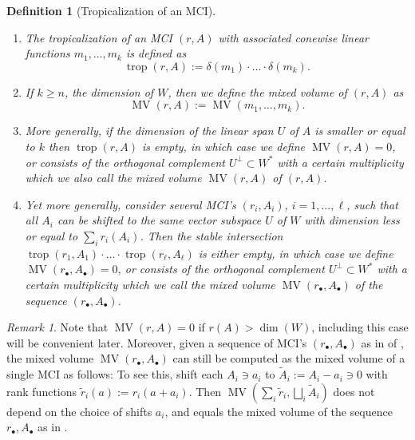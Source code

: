 \documentclass[a4paper]{article}
\newtheorem{definition}{Definition}
\theoremstyle{remark}
\newtheorem{remark}{Remark}
\def\corn{\delta}
\DeclareMathOperator{\trop}{trop}
\DeclareMathOperator{\mv}{MV}
\begin{document}
\begin{definition}[Tropicalization of an MCI]
  \label{def:tropmci}
  \begin{enumerate}
  \item The {\em tropicalization of an MCI} $(r,A)$ with associated conewise
  linear functions $m_1,\dots,m_k$ is defined as
  \[\trop(r,A) := \corn(m_1)\cdot \hdots \cdot \corn(m_k).\]
  \item \label{defitem:mv1} If $k \geq n$, the dimension of $W$, then we
  define the {\em mixed volume} of $(r,A)$ as
  \[\mv(r,A):= \mv(m_1,\dots,m_k).\]
\item \label{defitem:mv2} More generally, if the dimension of the linear span $U$ of $A$
  is smaller or equal to $k$ then $\trop(r,A)$ is empty, in which
  case we define $\mv(r,A) = 0$, or consists of the orthogonal
  complement $U^{\bot}\subset W^{*}$ with a certain multiplicity which we also call
  the mixed volume $\mv(r,A)$ of $(r,A)$.
\item \label{defitem:tropmciseq} Yet more generally, consider several MCI's $(r_i,A_i)$,
  $i=1,\dots,\ell$, such that all $A_i$ can be shifted to the same vector
  subspace $U$ of $W$ with dimension less or equal to
  $\sum_ir_i(A_i)$. Then the stable intersection
  $\trop(r_1,A_1)\cdot \hdots \cdot \trop(r_{\ell},A_{\ell})$ is either empty, in which
  case we define $\mv(r_{\bullet},A_{\bullet}) = 0$, or consists of the orthogonal
  complement $U^{\bot}\subset W^{*}$ with a certain multiplicity which we call
  the mixed volume $\mv(r_{\bullet},A_{\bullet})$ of the sequence $(r_{\bullet},A_{\bullet})$.
  \end{enumerate}
\end{definition}

\begin{remark}
  \label{rem:mvremarks}
  Note that $\mv(r,A) = 0$ if $r(A) > \dim(W)$, including this case
  will be convenient later. Moreover, given a sequence of MCI's
  $(r_{\bullet},A_{\bullet})$ as in  of ,
  the mixed volume $\mv(r_{\bullet},A_{\bullet})$ can still be computed as the
  mixed volume of a single MCI as follows: To see this, shift each
  $A_i\ni a_i$ to $\tilde A_i:=A_i-a_i\ni 0$ with rank functions
  $\tilde r_i(a):=r_i(a+a_i)$. Then
  $\mv(\sum_i\tilde r_i, \bigsqcup_i\tilde A_i)$ does not depend on the
  choice of shifts $a_i$, and equals the mixed volume of
  the sequence $r_{\bullet},A_{\bullet}$ as in .
\end{remark}
\end{document}
